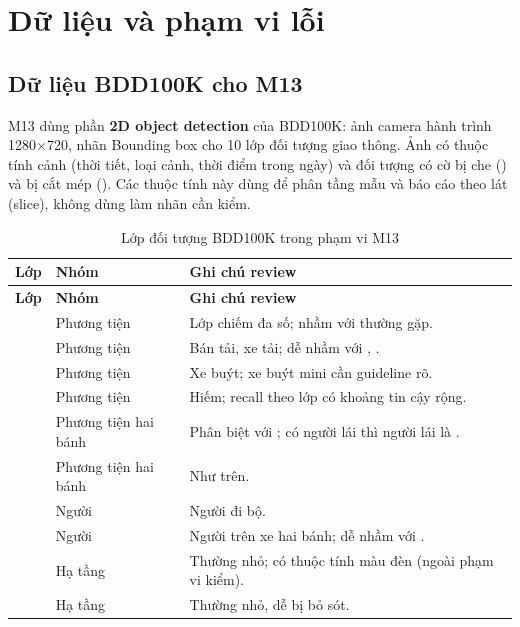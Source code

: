 \chapter{Dữ liệu và phạm vi lỗi}
\label{ch:data}

\section{Dữ liệu BDD100K cho M13}
\label{sec:bdd}
M13 dùng phần \textbf{2D object detection} của BDD100K: ảnh camera hành trình
1280$\times$720, nhãn Bounding box cho 10 lớp đối tượng giao thông. Ảnh có thuộc
tính cảnh (thời tiết, loại cảnh, thời điểm trong ngày) và đối tượng có cờ bị che
() và bị cắt mép (). Các thuộc tính này dùng để
phân tầng mẫu và báo cáo theo lát (slice), không dùng làm nhãn cần kiểm.

\begin{xltabular}{\linewidth}{@{}L{3cm}L{3.2cm}Y@{}}
\caption{Lớp đối tượng BDD100K trong phạm vi M13}\label{tab:bddclasses}\\
\toprule
\textbf{Lớp} & \textbf{Nhóm} & \textbf{Ghi chú review}\\
\midrule
\endfirsthead
\toprule \textbf{Lớp} & \textbf{Nhóm} & \textbf{Ghi chú review}\\ \midrule
\endhead
\bottomrule
\endfoot
{} & Phương tiện & Lớp chiếm đa số; nhầm với  thường gặp.\\
 & Phương tiện & Bán tải, xe tải; dễ nhầm với , .\\
 & Phương tiện & Xe buýt; xe buýt mini cần guideline rõ.\\
 & Phương tiện & Hiếm; recall theo lớp có khoảng tin cậy rộng.\\
 & Phương tiện hai bánh & Phân biệt với ; có người lái thì người lái là .\\
 & Phương tiện hai bánh & Như trên.\\
 & Người & Người đi bộ.\\
 & Người & Người trên xe hai bánh; dễ nhầm với .\\
 & Hạ tầng & Thường nhỏ; có thuộc tính màu đèn (ngoài phạm vi kiểm).\\
 & Hạ tầng & Thường nhỏ, dễ bị bỏ sót.\\
\end{xltabular}

